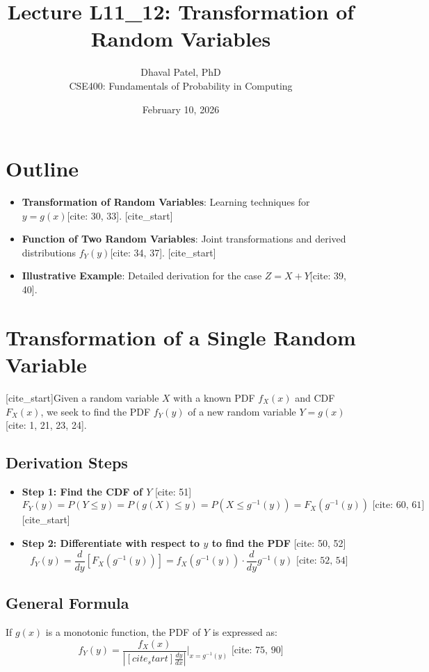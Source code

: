 \documentclass{article}
\title{Lecture L11\_12: Transformation of Random Variables}
\author{Dhaval Patel, PhD \\ CSE400: Fundamentals of Probability in Computing}
\date{February 10, 2026}
\begin{document}
\maketitle

\section{Outline}
\begin{itemize}
    [cite_start]\item \textbf{Transformation of Random Variables}: Learning techniques for $y=g(x)$[cite: 30, 33].
    [cite_start]\item \textbf{Function of Two Random Variables}: Joint transformations and derived distributions $f_{Y}(y)$[cite: 34, 37].
    [cite_start]\item \textbf{Illustrative Example}: Detailed derivation for the case $Z = X + Y$[cite: 39, 40].
\end{itemize}

\section{Transformation of a Single Random Variable}
[cite_start]Given a random variable $X$ with a known PDF $f_X(x)$ and CDF $F_X(x)$, we seek to find the PDF $f_Y(y)$ of a new random variable $Y = g(x)$[cite: 1, 21, 23, 24].

\subsection{Derivation Steps}
\begin{itemize}
    [cite_start]\item \textbf{Step 1: Find the CDF of $Y$} [cite: 51]
    \begin{equation}
        [cite_start]F_Y(y) = P(Y \le y) = P(g(X) \le y) = P(X \le g^{-1}(y)) = F_X(g^{-1}(y)) \text{ [cite: 60, 61]}
    \end{equation}
    [cite_start]\item \textbf{Step 2: Differentiate with respect to $y$ to find the PDF} [cite: 50, 52]
    \begin{equation}
        [cite_start]f_Y(y) = \frac{d}{dy}[F_X(g^{-1}(y))] = f_X(g^{-1}(y)) \cdot \frac{d}{dy}g^{-1}(y) \text{ [cite: 52, 54]}
    \end{equation}
\end{itemize}

\subsection{General Formula}
If $g(x)$ is a monotonic function, the PDF of $Y$ is expressed as:
\begin{equation}
    f_Y(y) = \frac{f_X(x)}{\left| [cite_start]\frac{dy}{dx} \right|} \bigg|_{x=g^{-1}(y)} \text{ [cite: 75, 90]}
\end{equation}
\end{document}
